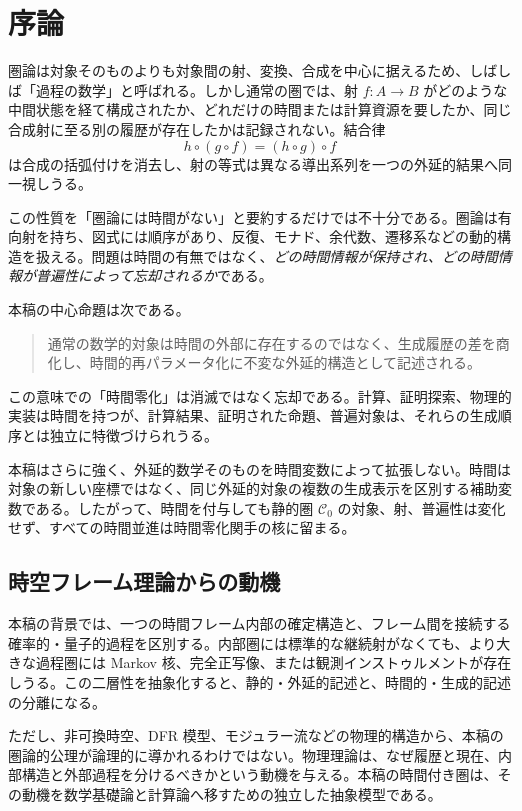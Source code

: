 \documentclass[a4paper,11pt]{ltjsarticle}
\theoremstyle{remark}
\newcommand{\C}{\mathcal C}
\begin{document}
\tableofcontents

\section{序論}

圏論は対象そのものよりも対象間の射、変換、合成を中心に据えるため、しばしば「過程の数学」と呼ばれる。しかし通常の圏では、射 $f:A\to B$ がどのような中間状態を経て構成されたか、どれだけの時間または計算資源を要したか、同じ合成射に至る別の履歴が存在したかは記録されない。結合律
\begin{equation}
 h\circ(g\circ f)=(h\circ g)\circ f
 \label{eq:assoc}
\end{equation}
は合成の括弧付けを消去し、射の等式は異なる導出系列を一つの外延的結果へ同一視しうる。

この性質を「圏論には時間がない」と要約するだけでは不十分である。圏論は有向射を持ち、図式には順序があり、反復、モナド、余代数、遷移系などの動的構造を扱える。問題は時間の有無ではなく、\emph{どの時間情報が保持され、どの時間情報が普遍性によって忘却されるか}である。

本稿の中心命題は次である。
\begin{quote}
通常の数学的対象は時間の外部に存在するのではなく、生成履歴の差を商化し、時間的再パラメータ化に不変な外延的構造として記述される。
\end{quote}
この意味での「時間零化」は消滅ではなく忘却である。計算、証明探索、物理的実装は時間を持つが、計算結果、証明された命題、普遍対象は、それらの生成順序とは独立に特徴づけられうる。

本稿はさらに強く、外延的数学そのものを時間変数によって拡張しない。時間は対象の新しい座標ではなく、同じ外延的対象の複数の生成表示を区別する補助変数である。したがって、時間を付与しても静的圏 $\C_0$ の対象、射、普遍性は変化せず、すべての時間並進は時間零化関手の核に留まる。

\subsection{時空フレーム理論からの動機}
本稿の背景では、一つの時間フレーム内部の確定構造と、フレーム間を接続する確率的・量子的過程を区別する。内部圏には標準的な継続射がなくても、より大きな過程圏には Markov 核、完全正写像、または観測インストゥルメントが存在しうる。この二層性を抽象化すると、静的・外延的記述と、時間的・生成的記述の分離になる。

ただし、非可換時空、DFR 模型、モジュラー流などの物理的構造から、本稿の圏論的公理が論理的に導かれるわけではない。物理理論は、なぜ履歴と現在、内部構造と外部過程を分けるべきかという動機を与える。本稿の時間付き圏は、その動機を数学基礎論と計算論へ移すための独立した抽象模型である。
\end{document}

